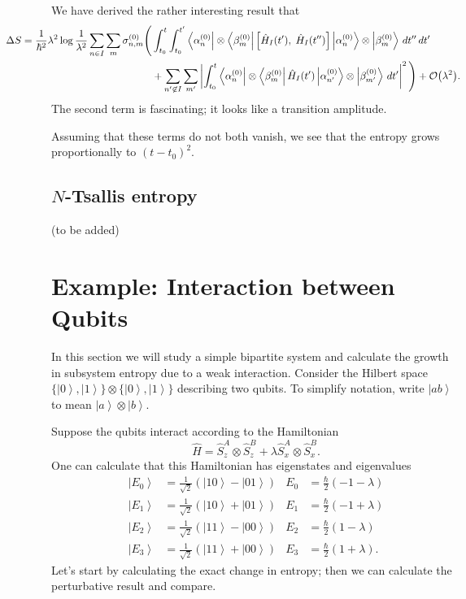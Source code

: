 \documentclass[11pt]{article}
\newcommand{\Od}[1]{\mathcal{O}{\left(#1\right)}}
\newcommand{\bra}[1]{\left\langle#1\right|}
\newcommand{\ket}[1]{\left|#1\right\rangle}
\newcommand{\op}[1]{\hat{#1}}
\theoremstyle{theorem}
\theoremstyle{remark}
\theoremstyle{step}
\theoremstyle{gap}
\begin{document}
We have derived the rather interesting result that
\begin{align}\label{eq.Sredresult}
\hspace{-4.5em}
\Delta S =\frac{1}{\hbar^2}\lambda^2 \log\frac{1}{\lambda^2} \sum_{n \in I}\sum_m \sigma_{n,m}^{(0)} \Bigg( &\int_{t_0}^t \int_{t_0}^{t^\prime} \bra{\alpha_n^{(0)}}\otimes\bra{\beta_m^{(0)}}\left[\op{H}_I (t^\prime),\; \op{H}_I(t^{\prime\prime})\right] \ket{\alpha_n^{(0)}}\otimes\ket{\beta_m^{(0)}}\,dt^{\prime\prime}\,dt^\prime \\
&+\sum_{n^\prime \not\in I} \sum_{m^\prime} \left|\int_{t_0}^t \bra{\alpha_{n}^{(0)}}\otimes\bra{\beta_{m}^{(0)}} \op{H}_I (t^{\prime})\ket{\alpha_{n^\prime}^{(0)}}\otimes\ket{\beta_{m^\prime}^{(0)}} \,dt^{\prime}\right|^2 \Bigg) + \Od{\lambda^2}.\nonumber
\end{align}
The second term is fascinating; it looks like a transition amplitude.

Assuming that these terms do not both vanish, we see that the entropy grows proportionally to \(\left(t-t_0\right)^2\).

\subsection{\(N\)-Tsallis entropy}

(to be added)

\section{Example: Interaction between Qubits}

In this section we will study a simple bipartite system and calculate the growth in subsystem entropy due to a weak interaction. Consider the Hilbert space \(\{\ket{0}, \ket{1}\}\otimes\{\ket{0}, \ket{1}\}\) describing two qubits. To simplify notation, write \(\ket{ab}\) to mean \(\ket{a}\otimes\ket{b}\).

Suppose the qubits interact according to the Hamiltonian
\[
\op{H} = \op{S}_z^{A}\otimes\op{S}_z^B + \lambda \op{S}_x^A \otimes \op{S}_x^B.
\]
One can calculate that this Hamiltonian has eigenstates and eigenvalues
\begin{align*}
\ket{E_0} &= \frac{1}{\sqrt{2}} \left(\ket{10}-\ket{01}\right) &
E_0 &= \frac{\hbar}{2} \left(-1-\lambda\right) \\
\ket{E_1} &= \frac{1}{\sqrt{2}} \left(\ket{10}+\ket{01}\right) &
E_1 &= \frac{\hbar}{2} \left(-1+\lambda\right) \\
\ket{E_2} &= \frac{1}{\sqrt{2}} \left(\ket{11}-\ket{00}\right) &
E_2 &= \frac{\hbar}{2} \left(1-\lambda\right) \\
\ket{E_3} &= \frac{1}{\sqrt{2}} \left(\ket{11}+\ket{00}\right) &
E_3 &= \frac{\hbar}{2} \left(1+\lambda\right).
\end{align*}
Let's start by calculating the exact change in entropy; then we can calculate the perturbative result and compare.
\end{document}
